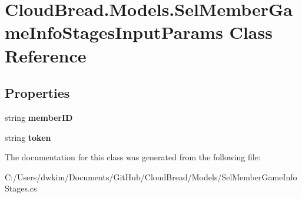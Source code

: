 \hypertarget{a00098}{}\section{Cloud\+Bread.\+Models.\+Sel\+Member\+Game\+Info\+Stages\+Input\+Params Class Reference}
\label{a00098}
\subsection*{Properties}
\begin{DoxyCompactItemize}
\item 
string {\bfseries member\+ID}\hypertarget{a00098_a155f6f2c9947a48dc0a7094c6bdd89c2}{}\label{a00098_a155f6f2c9947a48dc0a7094c6bdd89c2}

\item 
string {\bfseries token}\hypertarget{a00098_add75b16d5051bfd85340415d543b0cf7}{}\label{a00098_add75b16d5051bfd85340415d543b0cf7}

\end{DoxyCompactItemize}


The documentation for this class was generated from the following file\+:\begin{DoxyCompactItemize}
\item 
C\+:/\+Users/dwkim/\+Documents/\+Git\+Hub/\+Cloud\+Bread/\+Models/Sel\+Member\+Game\+Info\+Stages.\+cs\end{DoxyCompactItemize}
